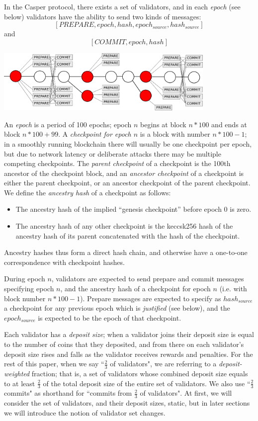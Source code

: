 \documentclass[12pt]{article}
\begin{document}
In the Casper protocol, there exists a set of validators, and in each \textit{epoch} (see below) validators have the ability to send two kinds of messages: $$[PREPARE, epoch, hash, epoch_{source}, hash_{source}]$$ and $$[COMMIT, epoch, hash]$$

\includegraphics[width=400px]{prepares_commits.png}

An \textit{epoch} is a period of 100 epochs; epoch $n$ begins at block $n * 100$ and ends at block $n * 100 + 99$. A \textit{checkpoint for epoch $n$} is a block with number $n * 100 - 1$; in a smoothly running blockchain there will usually be one checkpoint per epoch, but due to network latency or deliberate attacks there may be multiple competing checkpoints. The \textit{parent checkpoint} of a checkpoint is the 100th ancestor of the checkpoint block, and an \textit{ancestor checkpoint} of a checkpoint is either the parent checkpoint, or an ancestor checkpoint of the parent checkpoint. We define the \textit{ancestry hash} of a checkpoint as follows:

\begin{itemize}
\item The ancestry hash of the implied ``genesis checkpoint'' before epoch 0 is zero.
\item The ancestry hash of any other checkpoint is the keccsk256 hash of the ancestry hash of its parent concatenated with the hash of the checkpoint.
\end{itemize}

Ancestry hashes thus form a direct hash chain, and otherwise have a one-to-one correspondence with checkpoint hashes.

During epoch $n$, validators are expected to send prepare and commit messages specifying epoch $n$, and the ancestry hash of a checkpoint for epoch $n$ (i.e. with block number $n * 100 - 1$). Prepare messages are expected to specify as $hash_{source}$ a checkpoint for any previous epoch which is \textit{justified} (see below), and the $epoch_{source}$ is expected to be the epoch of that checkpoint.

Each validator has a \textit{deposit size}; when a validator joins their deposit size is equal to the number of coins that they deposited, and from there on each validator's deposit size rises and falls as the validator receives rewards and penalties. For the rest of this paper, when we say ``$\frac{2}{3}$ of validators", we are referring to a \textit{deposit-weighted} fraction; that is, a set of validators whose combined deposit size equals to at least $\frac{2}{3}$ of the total deposit size of the entire set of validators. We also use ``$\frac{2}{3}$ commits" as shorthand for ``commits from $\frac{2}{3}$ of validators". At first, we will consider the set of validators, and their deposit sizes, static, but in later sections we will introduce the notion of validator set changes.
\end{document}
